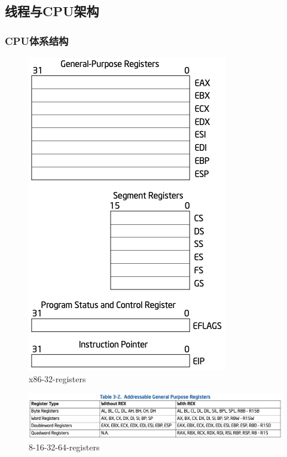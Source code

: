 \subsection{线程与CPU架构}
% 
\begin{frame}[fragile]
    \frametitle{CPU体系结构}
% 
% 
% 
% 
	\begin{figure}
		\centering
		\includegraphics[width=0.5\linewidth]{figs/x86-32-registers.png}
		\caption{x86-32-registers}
	\end{figure}


% 
% 
	\begin{figure}
		\centering
		\includegraphics[width=0.5\linewidth]{figs/8-16-32-64-registers.png}
		\caption{8-16-32-64-registers}
	\end{figure}


% 
\end{frame}
